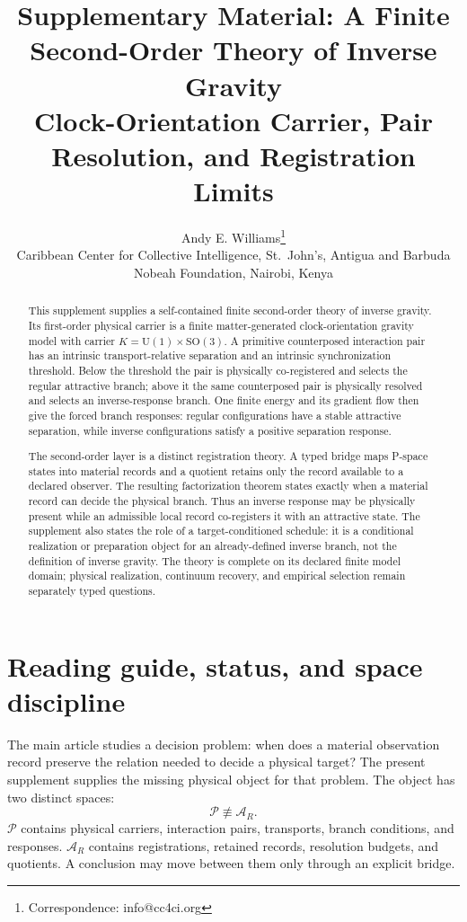 \documentclass[11pt]{article}
\title{Supplementary Material: A Finite Second-Order Theory of Inverse Gravity\\
\large Clock-Orientation Carrier, Pair Resolution, and Registration Limits}
\author{Andy E. Williams\thanks{Correspondence: info@cc4ci.org}\\[4pt]
\small Caribbean Center for Collective Intelligence, St.~John's, Antigua and Barbuda\\
\small Nobeah Foundation, Nairobi, Kenya}
\date{}
\newcommand{\Pspace}{\ensuremath{\mathcal P}}
\newcommand{\ARspace}{\ensuremath{\mathcal A_R}}
\theoremstyle{definition}
\begin{document}
\maketitle

\begin{abstract}
This supplement supplies a self-contained finite second-order theory of inverse
gravity.  Its first-order physical carrier is a finite matter-generated
clock-orientation gravity model with carrier
$K=\mathrm U(1)\times\mathrm{SO}(3)$.  A primitive counterposed interaction
pair has an intrinsic transport-relative separation and an intrinsic
synchronization threshold.  Below the threshold the pair is physically
co-registered and selects the regular attractive branch; above it the same
counterposed pair is physically resolved and selects an inverse-response branch.
One finite energy and its gradient flow then give the forced branch responses:
regular configurations have a stable attractive separation, while inverse
configurations satisfy a positive separation response.

The second-order layer is a distinct registration theory.  A typed bridge maps
P-space states into material records and a quotient retains only the record
available to a declared observer.  The resulting factorization theorem states
exactly when a material record can decide the physical branch.  Thus an inverse
response may be physically present while an admissible local record co-registers
it with an attractive state.  The supplement also states the role of a
target-conditioned schedule: it is a conditional realization or preparation
object for an already-defined inverse branch, not the definition of inverse
gravity.  The theory is complete on its declared finite model domain; physical
realization, continuum recovery, and empirical selection remain separately typed
questions.
\end{abstract}

\tableofcontents
\newpage

\section{Reading guide, status, and space discipline}
\label{sec:guide}

The main article studies a decision problem: when does a material observation
record preserve the relation needed to decide a physical target?  The present
supplement supplies the missing physical object for that problem.  The object has
two distinct spaces:
\begin{equation}
\Pspace \not\equiv \ARspace.
\label{eq:spaces-distinct}
\end{equation}
\Pspace{} contains physical carriers, interaction pairs, transports, branch
conditions, and responses.  $\ARspace$ contains registrations, retained records,
resolution budgets, and quotients.  A conclusion may move between them only
through an explicit bridge.
\end{document}
